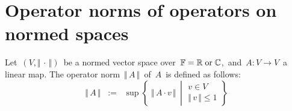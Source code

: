 

\section{Operator norms of operators on normed spaces}
\setcounter{theorem}{0}
\setcounter{equation}{0}


\renewcommand{\theenumi}{\roman{enumi}}
\renewcommand{\labelenumi}{\textnormal{(\theenumi)}$\;\;$}


\begin{definition}
\mbox{}
\vskip 0.1cm
\noindent
Let \,$(V,\Vert\,\cdot\,\Vert)$\, be a normed vector space over \,$\mathbb{F} = \mathbb{R} \;\textnormal{or}\; \mathbb{C}$,\,
and \,$A : V \longrightarrow V$\, a linear map.
The operator norm \,$\Vert\,A\,\Vert$\, of \,$A$\, is defined as follows:
\begin{equation*}
\Vert\,A\,\Vert
\;\; := \;\;
	\sup\left\{\;
		\Vert\, A \cdot v \,\Vert
		\,\;\left\vert\;
			\begin{array}{c}
			v \in V
			\\
			\Vert\, v \,\Vert \leq 1
			\end{array}
			\right. 
		\right\}
\end{equation*}
\end{definition}

